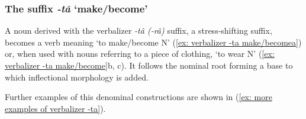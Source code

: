 
\subsubsection{The suffix \textit{-tâ} `make/become'}
\label{subsubsec: the make/become -ta suffix}

A noun derived with the verbalizer \textit{-tâ (-râ)} suffix, a stress-shifting suffix, becomes a verb meaning ‘to make/become N’ (\ref{ex: verbalizer -ta make/becomea}) or, when used with nouns referring to a piece of clothing, ‘to wear N’ (\ref{ex: verbalizer -ta make/become}b, c). It follows the nominal root forming a base to which inflectional morphology is added.

\ea\label{ex: verbalizer -ta make/become}

    \label{ex: verbalizer -ta make/becomea}
        \label{ex: verbalizer -ta make/becomeb}
            \label{ex: verbalizer -ta make/becomec}
    \z
\z

Further examples of this denominal constructions are shown in (\ref{ex: more examples of verbalizer -ta}).

